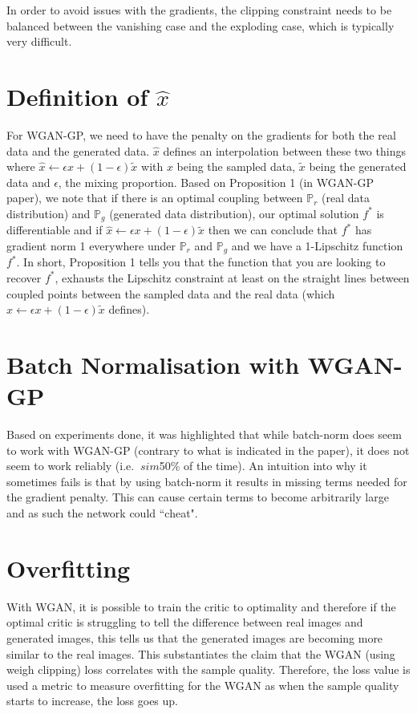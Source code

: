 \documentclass{article}
\begin{document}
In order to avoid issues with the gradients, the clipping constraint needs to be balanced between the vanishing case and the exploding case, which is typically very difficult.

\section{Definition of $\hat{x}$} 
For WGAN-GP, we need to have the penalty on the gradients for both the real data and the generated data. $\hat{x}$ defines an interpolation between these two things where $\hat{x} \leftarrow \epsilon x + (1- \epsilon) \tilde{x} $ with $x$ being the sampled data, $\tilde{x}$ being the generated data and $\epsilon$,  the mixing proportion. Based on Proposition 1 (in WGAN-GP paper), we note that if there is an optimal coupling between $\mathbb{P}_r$ (real data distribution) and $\mathbb{P}_g$ (generated data distribution), our optimal solution $f^*$ is differentiable and if $\hat{x} \leftarrow \epsilon x + (1- \epsilon) \tilde{x} $ then we can conclude that $f^*$ has gradient norm 1 everywhere under $\mathbb{P}_r$ and $\mathbb{P}_g$ and we have a 1-Lipschitz function $f^*$. In short, Proposition 1 tells you that the function that you are looking to recover $f^*$, exhausts the Lipschitz constraint at least on the straight lines between coupled points between the sampled data and the real data (which $\hat{x} \leftarrow \epsilon x + (1- \epsilon) \tilde{x} $ defines).

\section{Batch Normalisation with WGAN-GP}
Based on experiments done, it was highlighted that while batch-norm does seem to work with WGAN-GP (contrary to what is indicated in the paper), it does not seem to work reliably (i.e.  $\ sim$50\% of the time). An intuition into why it sometimes fails is that by using batch-norm it results in missing terms needed for the gradient penalty. This can cause certain terms to become arbitrarily large and as such the network could ``cheat".

\section{Overfitting}
With WGAN, it is possible to train the critic to optimality and therefore if the optimal critic is struggling to tell the difference between real images and generated images, this tells us that the generated images are becoming more similar to the real images. This substantiates the claim that the WGAN (using weigh clipping) loss correlates with the sample quality. Therefore, the loss value is used a metric to measure overfitting for the WGAN as when the sample quality starts to increase, the loss goes up.
\end{document}
